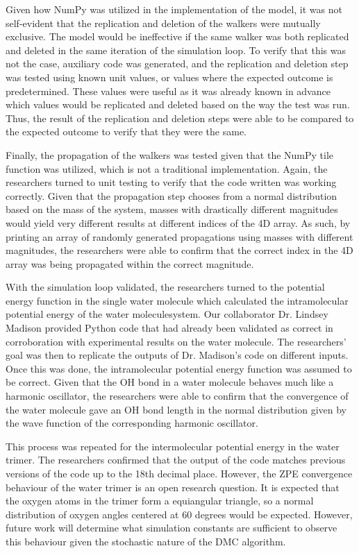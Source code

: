 \documentclass[journal=jacsat,manuscript=article]{achemso}
\begin{document}
Given how NumPy was utilized in the implementation of the model, it was not self-evident that the replication and deletion of the walkers were mutually exclusive. The model would be ineffective if the same walker was both replicated and deleted in the same iteration of the simulation loop. To verify that this was not the case, auxiliary code was generated, and the replication and deletion step was tested using known unit values, or values where the expected outcome is predetermined. These values were useful as it was already known in advance which values would be replicated and deleted based on the way the test was run. Thus, the result of the replication and deletion steps were able to be compared to the expected outcome to verify that they were the same.

Finally, the propagation of the walkers was tested given that the NumPy tile function was utilized, which is not a traditional implementation. Again, the researchers turned to unit testing to verify that the code written was working correctly. Given that the propagation step chooses from a normal distribution based on the mass of the system, masses with drastically different magnitudes would yield very different results at different indices of the 4D array. As such, by printing an array of randomly generated propagations using masses with different magnitudes, the researchers were able to confirm that the correct index in the 4D array was being propagated within the correct magnitude. 

With the simulation loop validated, the researchers turned to the potential energy function in the single water molecule which calculated the intramolecular potential energy of the water moleculesystem. Our collaborator Dr. Lindsey Madison provided Python code that had already been validated as correct in corroboration with experimental results on the water molecule.\cite{Stillinger1975} The researchers’ goal was then to replicate the outputs of Dr. Madison’s code on different inputs. Once this was done, the intramolecular potential energy function was assumed to be correct. Given that the OH bond in a water molecule behaves much like a harmonic oscillator, the researchers were able to confirm that the convergence of the water molecule gave an OH bond length in the normal distribution given by the wave function of the corresponding harmonic oscillator. 

This process was repeated for the intermolecular potential energy in the water trimer. The researchers confirmed that the output of the code matches previous versions of the code up to the 18th decimal place. However, the ZPE convergence behaviour of the water trimer is an open research question. It is expected that the oxygen atoms in the trimer form a equiangular triangle\cite{Madison2020}, so a normal distribution of oxygen angles centered at 60 degrees would be expected. However, future work will determine what simulation constants are sufficient to observe this behaviour given the stochastic nature of the DMC algorithm.
\end{document}
